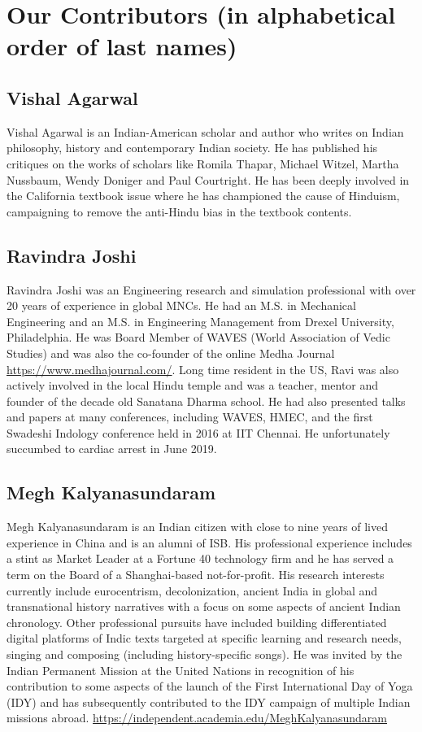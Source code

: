 
\chapter*{Our Contributors (in alphabetical order of last names)}\label{contributors}

\section*{Vishal Agarwal}

Vishal Agarwal is an Indian-American scholar and author who writes on Indian philosophy, history and contemporary Indian society. He has published his critiques on the works of scholars like Romila Thapar, Michael Witzel, Martha Nussbaum, Wendy Doniger and Paul Courtright. He has been deeply involved in the California textbook issue where he has championed the cause of Hinduism, campaigning to remove the anti-Hindu bias in the textbook contents.


\section*{Ravindra Joshi}

Ravindra Joshi was an Engineering research and simulation professional with over 20 years of experience in global MNCs. He had an M.S. in Mechanical Engineering and an M.S. in Engineering Management from Drexel University, Philadelphia. He was Board Member of WAVES (World Association of Vedic Studies) and was also the co-founder of the online Medha Journal \url{https://www.medhajournal.com/}. Long time resident in the US, Ravi was also actively involved in the local Hindu temple and was a teacher, mentor and founder of the decade old Sanatana Dharma school. He had also presented talks and papers at many conferences, including WAVES, HMEC, and the first Swadeshi Indology conference held in 2016 at IIT Chennai. He unfortunately succumbed to cardiac arrest in June 2019.


\section*{Megh Kalyanasundaram}

Megh Kalyanasundaram is an Indian citizen with close to nine years of lived experience in China and is an alumni of ISB. His professional experience includes a stint as Market Leader at a Fortune 40 technology firm and he has served a term on the Board of a Shanghai-based not-for-profit. His research interests currently include eurocentrism, decolonization, ancient India in global and transnational history narratives with a focus on some aspects of ancient Indian chronology. Other professional pursuits have included building differentiated digital platforms of Indic texts targeted at specific learning and research needs, singing and composing (including history-specific songs). He was invited by the Indian Permanent Mission at the United Nations in recognition of his contribution to some aspects of the launch of the First International Day of Yoga (IDY) and has subsequently contributed to the IDY campaign of multiple Indian missions abroad. \url{https://independent.academia.edu/MeghKalyanasundaram}



